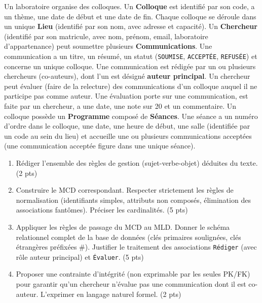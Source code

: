 \documentclass[11pt]{article}
\begin{document}
\begin{exercice}
Un laboratoire organise des colloques. Un \textbf{Colloque} est identifié par son code, a un thème, une date de début et une date de fin. Chaque colloque se déroule dans un unique \textbf{Lieu} (identifié par son nom, avec adresse et capacité). Un \textbf{Chercheur} (identifié par son matricule, avec nom, prénom, email, laboratoire d'appartenance) peut soumettre plusieurs \textbf{Communications}. Une communication a un titre, un résumé, un statut (\texttt{SOUMISE}, \texttt{ACCEPTÉE}, \texttt{REFUSÉE}) et concerne un unique colloque. Une communication est rédigée par un ou plusieurs chercheurs (co-auteurs), dont l'un est désigné \textbf{auteur principal}. Un chercheur peut évaluer (faire de la relecture) des communications d'un colloque auquel il ne participe pas comme auteur. Une évaluation porte sur une communication, est faite par un chercheur, a une date, une note sur 20 et un commentaire. Un colloque possède un \textbf{Programme} composé de \textbf{Séances}. Une séance a un numéro d'ordre dans le colloque, une date, une heure de début, une salle (identifiée par un code au sein du lieu) et accueille une ou plusieurs communications acceptées (une communication acceptée figure dans une unique séance).
\begin{enumerate}
    \item Rédiger l'ensemble des règles de gestion (sujet-verbe-objet) déduites du texte. (2 pts)
    \item Construire le MCD correspondant. Respecter strictement les règles de normalisation (identifiants simples, attributs non composés, élimination des associations fantômes). Préciser les cardinalités. (5 pts)
    \item Appliquer les règles de passage du MCD au MLD. Donner le schéma relationnel complet de la base de données (clés primaires soulignées, clés étrangères préfixées \#). Justifier le traitement des associations \texttt{Rédiger} (avec rôle auteur principal) et \texttt{Évaluer}. (5 pts)
    \item Proposer une contrainte d'intégrité (non exprimable par les seules PK/FK) pour garantir qu'un chercheur n'évalue pas une communication dont il est co-auteur. L'exprimer en langage naturel formel. (2 pts)
\end{enumerate}
\end{exercice}
\end{document}
